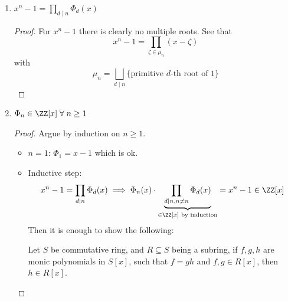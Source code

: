 \begin{proposition}
	\leavevmode
	\begin{enumerate}
		\item \( x^n - 1 = \prod_{d \mid n} \Phi_d(x) \)
		      \begin{proof}
			      For \( x^n - 1 \) there is clearly no multiple roots. See that
			      \[
				      x^n - 1 = \prod_{\zeta \in \mu_n} (x - \zeta)
			      \]
			      with
			      \[
				      \mu_n = \bigsqcup_{d\mid n} \{\text{primitive } d \text{-th root of 1}\}
			      \]
		      \end{proof}
		\item \( \Phi_n \in \ZZ[x] \; \forall \; n \geq 1 \)
		      \begin{proof}
			      Argue by induction on \( n \geq 1 \).
			      \begin{itemize}
				      \item \( n = 1 \): \( \Phi_1 = x - 1 \) which is ok.
				      \item Inductive step:
				            \[
					            x^n  -1 = \prod_{d\mid n} \Phi_d(x) \implies \Phi_n(x) \cdot \underbrace{\prod_{d\mid n, n\ne
							            n} \Phi_d(x)}_{\in \ZZ[x] \text{ by induction}} = x^n -1 \in \ZZ[x]
				            \]
				            Then it is enough to show the following:
				            \begin{proposition}
					            Let \( S \) be commutative ring, and \( R \subseteq S \) being a subring, if
					            \( f,g,h \) are monic polynomials in \( S[x] \), such that \( f=gh \) and \(
					            f,g \in R[x] \), then \( h \in R[x] \).
				            \end{proposition}


\end{itemize}
\end{proof}
\end{enumerate}
\end{proposition}
